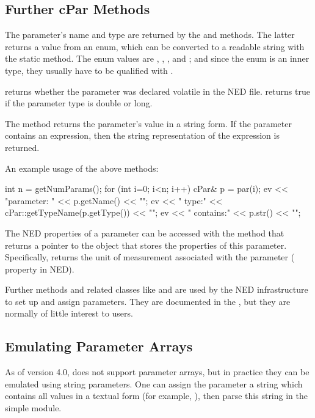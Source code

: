 \subsection{Further cPar Methods}

The parameter's name and type are returned by the  and
 methods. The latter returns a value from an enum,
which can be converted to a readable string with the 
static method. The enum values are , , ,
 and ; and since the enum is an inner type,
they usually have to be qualified with .

 returns whether the parameter was declared volatile
in the NED file.  returns true if the parameter
type is double or long.

The  method returns the parameter's value in a string form.
If the parameter contains an expression, then the string representation
of the expression is returned.

An example usage of the above methods:

\begin{cpp}
int n = getNumParams();
for (int i=0; i<n; i++)
{
    cPar& p = par(i);
    ev << "parameter: " << p.getName() << "\n";
    ev << "  type:" << cPar::getTypeName(p.getType()) << "\n";
    ev << "  contains:" << p.str() << "\n";
}
\end{cpp}

The NED properties of a parameter can be accessed with the 
method that returns a pointer to the  object that stores
the properties of this parameter. Specifically,  returns
the unit of measurement associated with the parameter ( property in NED).

Further  methods and related classes like  and
 are used by the NED infrastructure to set up and
assign parameters. They are documented in the , but
they are normally of little interest to users.


\subsection{Emulating Parameter Arrays}

As of version 4.0, {\opp} does not support parameter arrays,
but in practice they can be emulated using string parameters.
One can assign the parameter a string which contains all values
in a textual form (for example, ), then
parse this string in the simple module.

